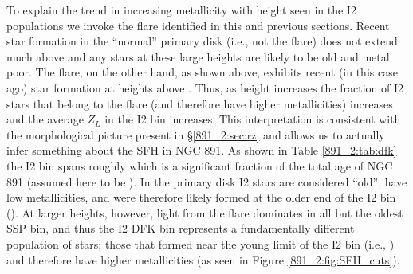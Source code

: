 To explain the trend in increasing metallicity with height seen in the
I2 populations we invoke the flare identified in this and previous
sections. Recent star formation in the ``normal'' primary disk (i.e.,
not the flare) does not extend much above  and any
stars at these large heights are likely to be old and metal poor. The
flare, on the other hand, as shown above, exhibits recent (in this
case  ago) star formation at heights above
. Thus, as height increases the fraction of I2 stars that
belong to the flare (and therefore have higher metallicities)
increases and the average $Z_L$ in the I2 bin increases. This
interpretation is consistent with the morphological picture present in
\S\ref{891_2:sec:rz} and allows us to actually infer something about the SFH
in NGC 891. As shown in Table \ref{891_2:tab:dfk} the I2 bin spans roughly
 which is a significant fraction of the total age of NGC
891 (assumed here to be ). In the primary disk I2 stars
are considered ``old'', have low metallicities, and were therefore
likely formed at the older end of the I2 bin (). At
larger heights, however, light from the flare dominates in all but the
oldest SSP bin, and thus the I2 DFK bin represents a fundamentally
different population of stars; those that formed near the young limit
of the I2 bin (i.e., ) and therefore have higher
metallicities (as seen in Figure \ref{891_2:fig:SFH_cuts}).





